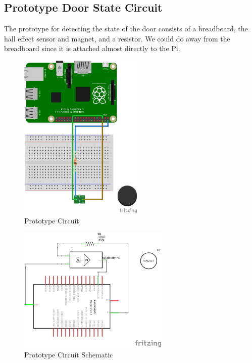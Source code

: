 \documentclass[10pt]{article}
\begin{document}
{\subsection{Prototype Door State Circuit}

The prototype for detecting the state of the door consists of a breadboard, the hall effect sensor and magnet, and a resistor. We could do away from the breadboard since it is attached almost directly to the Pi.

\begin{figure}[h]
\centering
\caption{Prototype Circuit}
\label{Prototype Circuit}
\includegraphics[height=8cm]{images/hall_effect_diagram.png}
\end{figure}

\begin{figure}[h]
\centering
\caption{Prototype Circuit Schematic}
\label{Prototype Circuit Schematic}
\includegraphics[height=6cm]{images/hall_effect_schem.png}
\end{figure}
\newpage
}
\end{document}
